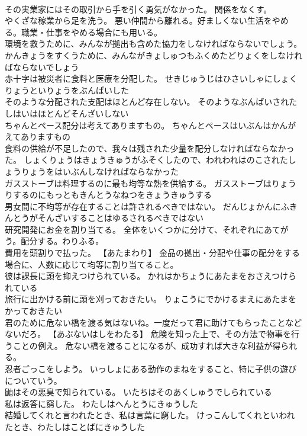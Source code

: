 \documentclass[8pt]{extreport}
\begin{document}
\begin{CJK}{UTF8}{min}
\\	その実業家にはその取引から手を引く勇気がなかった。	関係をなくす。
\\	やくざな稼業から足を洗う。	悪い仲間から離れる。好ましくない生活をやめる。職業・仕事をやめる場合にも用いる。
\\	環境を救うために、みんなが拠出も含めた協力をしなければならないでしょう。	かんきょうをすくうために、みんながきょしゅつもふくめたどりょくをしなければならないでしょう 
\\	赤十字は被災者に食料と医療を分配した。	せきじゅうじはひさいしゃにしょくりょうといりょうをぶんぱいした 
\\	そのような分配された支配はほとんど存在しない。	そのようなぶんぱいされたしはいはほとんどそんざいしない 
\\	ちゃんとペース配分は考えてありますもの。	ちゃんとペースはいぶんはかんがえてありますもの 
\\	食料の供給が不足したので、我々は残された少量を配分しなければならなかった。	しょくりょうはきょうきゅうがふそくしたので、われわれはのこされたしょうりょうをはいぶんしなければならなかった 
\\	ガスストーブは料理するのに最も均等な熱を供給する。	ガスストーブはりょうりするのにもっともきんとうなねつをきょうきゅうする 
\\	男女間に不均等が存在することは許されるべきではない。	だんじょかんにふきんとうがそんざいすることはゆるされるべきではない 
\\	研究開発にお金を割り当てる。	全体をいくつかに分けて、それぞれにあてがう。配分する。わりふる。
\\	費用を頭割りで払った。	【あたまわり】 金品の拠出・分配や仕事の配分をする場合に、人数に応じて均等に割り当てること。
\\	彼は課長に頭を抑えつけられている。	かれはかちょうにあたまをおさえつけられている 
\\	旅行に出かける前に頭を刈っておきたい。	りょこうにでかけるまえにあたまをかっておきたい 
\\	君のために危ない橋を渡る気はないね。一度だって君に助けてもらったことなどないだろ。	【あぶないはしをわたる】 危険を知った上で、その方法で物事を行うことの例え。 危ない橋を渡ることになるが、成功すれば大きな利益が得られる。
\\	忍者ごっこをしよう。	いっしょにある動作のまねをすること、特に子供の遊びについていう。
\\	鼬はその悪臭で知られている。	いたちはそのあくしゅうでしられている 
\\	私は返答に窮した。	わたしはへんとうにきゅうした 
\\	結婚してくれと言われたとき、私は言葉に窮した。	けっこんしてくれといわれたとき、わたしはことばにきゅうした 

\end{CJK}
\end{document}
